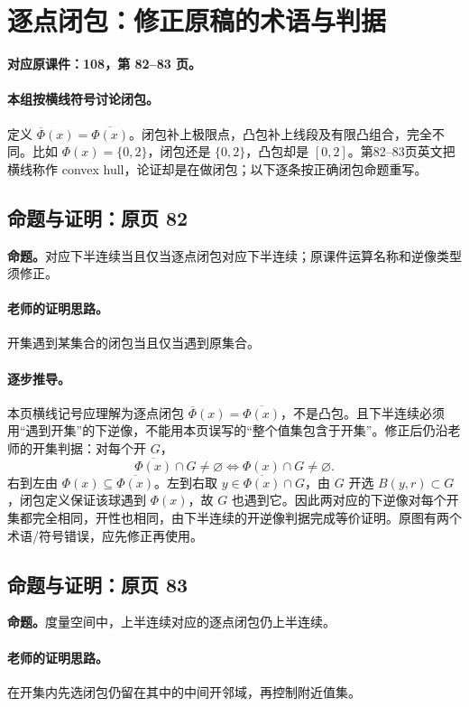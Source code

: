 \documentclass[11pt,a4paper]{article}
\theoremstyle{definition}\newtheorem{definition}{定义}\newtheorem{example}{例}
\begin{document}
\clearpage\section{逐点闭包：修正原稿的术语与判据}\label{g:108:82}

\textbf{对应原课件：108，第 82--83 页。}


\paragraph{本组按横线符号讨论闭包。}
定义 $\overline\Phi(x)=\overline{\Phi(x)}$。闭包补上极限点，凸包补上线段及有限凸组合，完全不同。比如 $\Phi(x)=\{0,2\}$，闭包还是 $\{0,2\}$，凸包却是 $[0,2]$。第82--83页英文把横线称作 convex hull，论证却是在做闭包；以下逐条按正确闭包命题重写。


\subsection{命题与证明：原页 82}

\textbf{命题。}对应下半连续当且仅当逐点闭包对应下半连续；原课件运算名称和逆像类型须修正。

\paragraph{老师的证明思路。}开集遇到某集合的闭包当且仅当遇到原集合。

\paragraph{逐步推导。}本页横线记号应理解为逐点闭包 $\overline\Phi(x)=\overline{\Phi(x)}$，不是凸包。且下半连续必须用“遇到开集”的下逆像，不能用本页误写的“整个值集包含于开集”。修正后仍沿老师的开集判据：对每个开 $G$，
\[\overline{\Phi(x)}\cap G\ne\varnothing\iff\Phi(x)\cap G\ne\varnothing.\]
右到左由 $\Phi(x)\subseteq\overline{\Phi(x)}$。左到右取 $y\in\overline{\Phi(x)}\cap G$，由 $G$ 开选 $B(y,r)\subset G$，闭包定义保证该球遇到 $\Phi(x)$，故 $G$ 也遇到它。因此两对应的下逆像对每个开集都完全相同，开性也相同，由下半连续的开逆像判据完成等价证明。原图有两个术语/符号错误，应先修正再使用。

\subsection{命题与证明：原页 83}

\textbf{命题。}度量空间中，上半连续对应的逐点闭包仍上半连续。

\paragraph{老师的证明思路。}在开集内先选闭包仍留在其中的中间开邻域，再控制附近值集。
\end{document}
